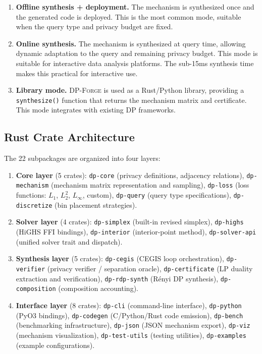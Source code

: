 \documentclass[11pt,a4paper]{article}
\newcommand{\dpforge}{\textsc{DP-Forge}}
\begin{document}
\begin{enumerate}[nosep]
  \item \textbf{Offline synthesis + deployment.}  The mechanism is synthesized
        once and the generated code is deployed.  This is the most common mode,
        suitable when the query type and privacy budget are fixed.

  \item \textbf{Online synthesis.}  The mechanism is synthesized at query time,
        allowing dynamic adaptation to the query and remaining privacy budget.
        This mode is suitable for interactive data analysis platforms.  The
        sub-15ms synthesis time makes this practical for interactive use.

  \item \textbf{Library mode.}  \dpforge{} is used as a Rust/Python library,
        providing a \texttt{synthesize()} function that returns the mechanism
        matrix and certificate.  This mode integrates with existing DP
        frameworks.
\end{enumerate}

\subsection{Rust Crate Architecture}
\label{subsec:cratestructure}

The 22 subpackages are organized into four layers:

\begin{enumerate}[nosep]
  \item \textbf{Core layer} (5 crates): \texttt{dp-core} (privacy definitions,
        adjacency relations), \texttt{dp-mechanism} (mechanism matrix
        representation and sampling), \texttt{dp-loss} (loss functions:
        $L_1$, $L_2^2$, $L_\infty$, custom), \texttt{dp-query} (query type
        specifications), \texttt{dp-discretize} (bin placement strategies).

  \item \textbf{Solver layer} (4 crates): \texttt{dp-simplex} (built-in
        revised simplex), \texttt{dp-highs} (HiGHS FFI bindings),
        \texttt{dp-interior} (interior-point method), \texttt{dp-solver-api}
        (unified solver trait and dispatch).

  \item \textbf{Synthesis layer} (5 crates): \texttt{dp-cegis} (CEGIS loop
        orchestration), \texttt{dp-verifier} (privacy verifier / separation
        oracle), \texttt{dp-certificate} (LP duality extraction and
        verification), \texttt{dp-rdp-synth} (R\'enyi DP synthesis),
        \texttt{dp-composition} (composition accounting).

  \item \textbf{Interface layer} (8 crates): \texttt{dp-cli} (command-line
        interface), \texttt{dp-python} (PyO3 bindings), \texttt{dp-codegen}
        (C/Python/Rust code emission), \texttt{dp-bench} (benchmarking
        infrastructure), \texttt{dp-json} (JSON mechanism export),
        \texttt{dp-viz} (mechanism visualization), \texttt{dp-test-utils}
        (testing utilities), \texttt{dp-examples} (example configurations).
\end{enumerate}
\end{document}
